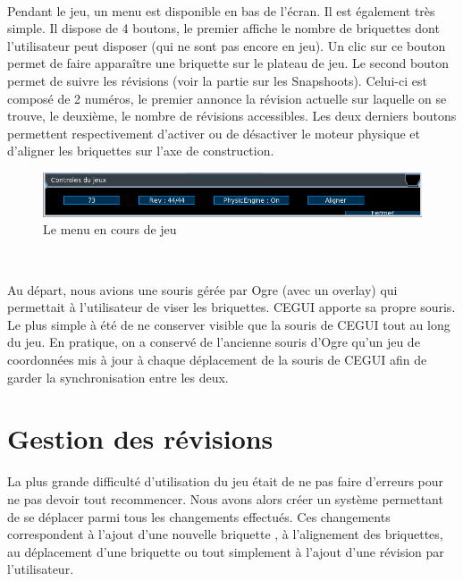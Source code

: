\documentclass[frenchb,twoside]{EPURapport}
\begin{document}
		\
		   
        Pendant le jeu, un menu est disponible en bas de l'écran. Il est
        également très simple. Il dispose de 4 boutons, le premier affiche le
        nombre de briquettes dont l'utilisateur peut disposer (qui ne sont pas
        encore en jeu). Un clic sur ce bouton permet de faire apparaître une
        briquette sur le plateau de jeu. Le second bouton permet de suivre les
        révisions (voir la partie sur les Snapshoots). Celui-ci est composé de 2
        numéros, le premier annonce la révision actuelle sur laquelle on se
        trouve, le deuxième, le nombre de révisions accessibles. Les deux
        derniers boutons permettent respectivement d'activer ou de désactiver le
        moteur physique et d'aligner les briquettes sur l'axe de construction.
		
		\begin{figure}[h]
			\centering
			\includegraphics[width=16cm]{images/menu_jeu.png}
			\caption{\label{fig:menu_jeu}Le menu en cours de jeu}
		\end{figure}
		
		\

        Au départ, nous avions une souris gérée par Ogre (avec un overlay) qui
        permettait à l'utilisateur de viser les briquettes. CEGUI apporte sa
        propre souris. Le plus simple à été de ne conserver visible que la
        souris de CEGUI tout au long du jeu. En pratique, on a conservé de
        l'ancienne souris d'Ogre qu'un jeu de coordonnées mis à jour à chaque
        déplacement de la souris de CEGUI afin de garder la synchronisation
        entre les deux.
        

    \section{Gestion des révisions}
    
		La plus grande difficulté d'utilisation du jeu était de ne pas faire
		d'erreurs pour ne pas devoir tout recommencer. Nous avons alors créer
		un système permettant de se déplacer parmi tous les changements effectués.
		Ces changements correspondent à l'ajout d'une nouvelle briquette
		, à l'alignement des briquettes, au déplacement d'une briquette
		ou tout simplement à l'ajout d'une révision par l'utilisateur.
		
\end{document}
